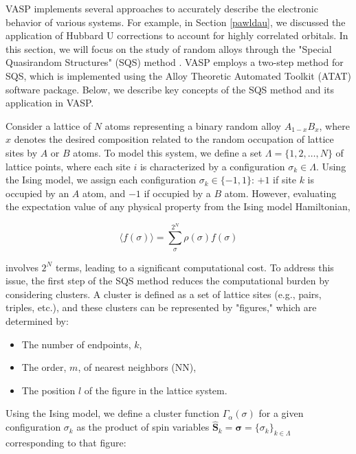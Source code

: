 VASP implements several approaches to accurately describe the electronic behavior of various systems. For example, in Section \ref{pawldau}, we discussed the application of Hubbard U corrections to account for highly correlated orbitals. In this section, we will focus on the study of random alloys through the "Special Quasirandom Structures" (SQS) method \supercite{wei1990electronic,zunger1990special}. VASP employs a two-step method for SQS, which is implemented using the Alloy Theoretic Automated Toolkit (ATAT) software package. Below, we describe key concepts of the SQS method and its application in VASP.

Consider a lattice of \(N\) atoms representing a binary random alloy \(A_{1-x}B_{x}\), where \(x\) denotes the desired composition related to the random occupation of lattice sites by \(A\) or \(B\) atoms. To model this system, we define a set \(\Lambda = \{1, 2, \dots, N\}\) of lattice points, where each site \(i\) is characterized by a configuration \(\sigma_k \in \Lambda\). Using the Ising model, we assign each configuration \(\sigma_k \in \{-1, 1\}\): \(+1\) if site \(k\) is occupied by an \(A\) atom, and \(-1\) if occupied by a \(B\) atom. However, evaluating the expectation value of any physical property from the Ising model Hamiltonian,

\begin{equation}
	\langle f(\sigma) \rangle = \sum_{\sigma}^{2^N} \rho(\sigma) f(\sigma)
	\label{eq:2.113}
\end{equation}

involves \(2^N\) terms, leading to a significant computational cost. To address this issue, the first step of the SQS method reduces the computational burden by considering clusters. A cluster is defined as a set of lattice sites (e.g., pairs, triples, etc.), and these clusters can be represented by "figures," which are determined by:
\begin{itemize}
	\item The number of endpoints, \(k\),
	\item The order, \(m\), of nearest neighbors (NN),
	\item The position \(l\) of the figure in the lattice system.
\end{itemize}

Using the Ising model, we define a cluster function \(\Gamma_\alpha(\sigma)\) for a given configuration \(\sigma_k\) as the product of spin variables \(\hat{\mathbf{S}}_k = \mathbf{\sigma} = \{\sigma_k\}_{k \in \Lambda}\) corresponding to that figure:

